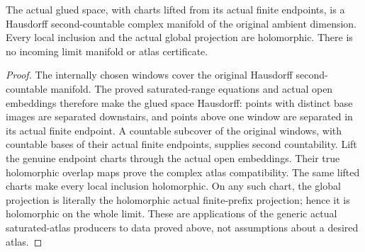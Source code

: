 \begin{theorem}
\label{hir:actual-locally-finite-history-limit-complex-manifold}
\leanok
The actual glued space, with charts lifted from its actual finite endpoints,
is a Hausdorff second-countable complex manifold of the original ambient
dimension. Every local inclusion and the actual global projection are
holomorphic. There is no incoming limit manifold or atlas certificate.
\end{theorem}
\begin{proof}
The internally chosen windows cover the original Hausdorff second-countable
manifold. The proved saturated-range equations and actual open embeddings
therefore make the glued space Hausdorff: points with distinct base images
are separated downstairs, and points above one window are separated in its
actual finite endpoint. A countable subcover of the original windows, with
countable bases of their actual finite endpoints, supplies second
countability. Lift the genuine endpoint charts through the actual open
embeddings. Their true holomorphic overlap maps prove the complex atlas
compatibility. The same lifted charts make every local inclusion
holomorphic. On any such chart, the global projection is literally the
holomorphic actual finite-prefix projection; hence it is holomorphic on the
whole limit. These are applications of the generic actual saturated-atlas
producers to data proved above, not assumptions about a desired atlas.
\end{proof}

